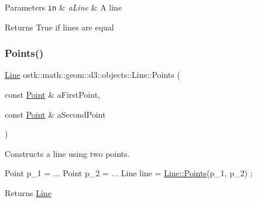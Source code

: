 \begin{DoxyParams}[1]{Parameters}
\mbox{\tt in}  & {\em a\+Line} & A line \\
\hline
\end{DoxyParams}
\begin{DoxyReturn}{Returns}
True if lines are equal 
\end{DoxyReturn}
\mbox{\label{classostk_1_1math_1_1geom_1_1d3_1_1objects_1_1_line_a23ebcd8b2720d8daefba7191eccdf8cb}} 
\subsubsection{\texorpdfstring{Points()}{Points()}}
{\footnotesize\ttfamily \hyperlink{classostk_1_1math_1_1geom_1_1d3_1_1objects_1_1_line}{Line} ostk\+::math\+::geom\+::d3\+::objects\+::\+Line\+::\+Points (\begin{DoxyParamCaption}\item[{const \hyperlink{classostk_1_1math_1_1geom_1_1d3_1_1objects_1_1_point}{Point} \&}]{a\+First\+Point,  }\item[{const \hyperlink{classostk_1_1math_1_1geom_1_1d3_1_1objects_1_1_point}{Point} \&}]{a\+Second\+Point }\end{DoxyParamCaption})\hspace{0.3cm}{\ttfamily [static]}}



Constructs a line using two points. 


\begin{DoxyCode}
Point p\_1 = ...
Point p\_2 = ...
Line line = \hyperlink{classostk_1_1math_1_1geom_1_1d3_1_1objects_1_1_line_a23ebcd8b2720d8daefba7191eccdf8cb}{Line::Points}(p\_1, p\_2) ;
\end{DoxyCode}


\begin{DoxyReturn}{Returns}
\hyperlink{classostk_1_1math_1_1geom_1_1d3_1_1objects_1_1_line}{Line} 
\end{DoxyReturn}
\mbox{\label{classostk_1_1math_1_1geom_1_1d3_1_1objects_1_1_line_ad3e7bf31cdde2d265dd9ff644b341f2d}} 
